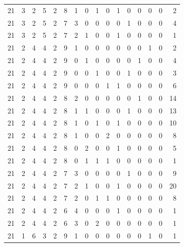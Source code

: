\begin{appendix}
{\begin{longtable}{lrrrrrrrrrrrrrrr}
    21        & 3  & 2  & 5  & 2  & 8  & 1  & 0  & 1  & 0  & 1  & 0  & 0   & 0   & 0   & 2    \\
    21        & 3  & 2  & 5  & 2  & 7  & 3  & 0  & 0  & 0  & 0  & 1  & 0   & 0   & 0   & 4    \\
    21        & 3  & 2  & 5  & 2  & 7  & 2  & 1  & 0  & 0  & 1  & 0  & 0   & 0   & 0   & 1    \\
    21        & 2  & 4  & 4  & 2  & 9  & 1  & 0  & 0  & 0  & 0  & 0  & 0   & 1   & 0   & 2    \\
    21        & 2  & 4  & 4  & 2  & 9  & 0  & 1  & 0  & 0  & 0  & 0  & 1   & 0   & 0   & 4    \\
    21        & 2  & 4  & 4  & 2  & 9  & 0  & 0  & 1  & 0  & 0  & 1  & 0   & 0   & 0   & 3    \\
    21        & 2  & 4  & 4  & 2  & 9  & 0  & 0  & 0  & 1  & 1  & 0  & 0   & 0   & 0   & 6    \\
    21        & 2  & 4  & 4  & 2  & 8  & 2  & 0  & 0  & 0  & 0  & 0  & 1   & 0   & 0   & 14   \\
    21        & 2  & 4  & 4  & 2  & 8  & 1  & 1  & 0  & 0  & 0  & 1  & 0   & 0   & 0   & 13   \\
    21        & 2  & 4  & 4  & 2  & 8  & 1  & 0  & 1  & 0  & 1  & 0  & 0   & 0   & 0   & 10   \\
    21        & 2  & 4  & 4  & 2  & 8  & 1  & 0  & 0  & 2  & 0  & 0  & 0   & 0   & 0   & 8    \\
    21        & 2  & 4  & 4  & 2  & 8  & 0  & 2  & 0  & 0  & 1  & 0  & 0   & 0   & 0   & 5    \\
    21        & 2  & 4  & 4  & 2  & 8  & 0  & 1  & 1  & 1  & 0  & 0  & 0   & 0   & 0   & 1    \\
    21        & 2  & 4  & 4  & 2  & 7  & 3  & 0  & 0  & 0  & 0  & 1  & 0   & 0   & 0   & 9    \\
    21        & 2  & 4  & 4  & 2  & 7  & 2  & 1  & 0  & 0  & 1  & 0  & 0   & 0   & 0   & 20   \\
    21        & 2  & 4  & 4  & 2  & 7  & 2  & 0  & 1  & 1  & 0  & 0  & 0   & 0   & 0   & 8    \\
    21        & 2  & 4  & 4  & 2  & 6  & 4  & 0  & 0  & 0  & 1  & 0  & 0   & 0   & 0   & 1    \\
    21        & 2  & 4  & 4  & 2  & 6  & 3  & 0  & 2  & 0  & 0  & 0  & 0   & 0   & 0   & 1    \\
    21        & 1  & 6  & 3  & 2  & 9  & 1  & 0  & 0  & 0  & 0  & 0  & 0   & 1   & 0   & 1    \\

\end{longtable}}
\end{appendix}
